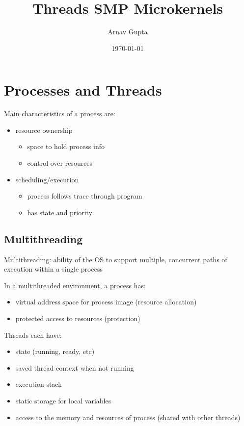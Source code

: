 \documentclass[11pt]{article}
\author{Arnav Gupta}
\date{\today}
\title{Threads SMP Microkernels}
\begin{document}
\maketitle
\tableofcontents

\section{Processes and Threads}
\label{sec:org35e42f4}
Main characteristics of a process are:
\begin{itemize}
\item resource ownership
\begin{itemize}
\item space to hold process info
\item control over resources
\end{itemize}
\item scheduling/execution
\begin{itemize}
\item process follows trace through program
\item has state and priority
\end{itemize}
\end{itemize}
\subsection{Multithreading}
\label{sec:org0928711}

Multithreading: ability of the OS to support multiple,
concurrent paths of execution within a single process

In a multithreaded environment, a process has:
\begin{itemize}
\item virtual address space for process image (resource allocation)
\item protected access to resources (protection)
\end{itemize}

Threads each have:
\begin{itemize}
\item state (running, ready, etc)
\item saved thread context when not running
\item execution stack
\item static storage for local variables
\item access to the memory and resources of process (shared with other threads)
\end{itemize}
\end{document}
